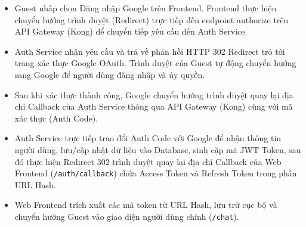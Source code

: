 \begin{itemize}
\item Guest nhấp chọn Đăng nhập Google trên Frontend. Frontend thực hiện chuyển hướng trình duyệt (Redirect) trực tiếp đến endpoint authorize trên API Gateway (Kong) để chuyển tiếp yêu cầu đến Auth Service.
\item Auth Service nhận yêu cầu và trả về phản hồi HTTP 302 Redirect trỏ tới trang xác thực Google OAuth. Trình duyệt của Guest tự động chuyển hướng sang Google để người dùng đăng nhập và ủy quyền.
\item Sau khi xác thực thành công, Google chuyển hướng trình duyệt quay lại địa chỉ Callback của Auth Service thông qua API Gateway (Kong) cùng với mã xác thực (Auth Code).
\item Auth Service trực tiếp trao đổi Auth Code với Google để nhận thông tin người dùng, lưu/cập nhật dữ liệu vào Database, sinh cặp mã JWT Token, sau đó thực hiện Redirect 302 trình duyệt quay lại địa chỉ Callback của Web Frontend (\texttt{/auth/callback}) chứa Access Token và Refresh Token trong phần URL Hash.
\item Web Frontend trích xuất các mã token từ URL Hash, lưu trữ cục bộ và chuyển hướng Guest vào giao diện người dùng chính (\texttt{/chat}).
\end{itemize}
